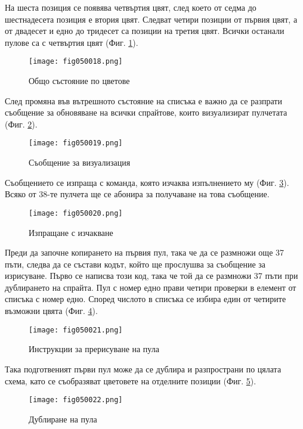 На шеста позиция се появява четвъртия цвят, след което от седма до шестнадесета позиция е втория цвят. Следват четири позиции от първия цвят, а от двадесет и едно до тридесет са позиции на третия цвят. Всички останали пулове са с четвъртия цвят (Фиг. \ref{fig050018}).

\begin{figure}[H]
  \centering
  \texttt{[image: fig050018.png]}
  \caption{Общо състояние по цветове}
\label{fig050018}
\end{figure}

След промяна във вътрешното състояние на списъка е важно да се разпрати съобщение за обновяване на всички спрайтове, които визуализират пулчетата (Фиг. \ref{fig050019}). 

\begin{figure}[H]
  \centering
  \texttt{[image: fig050019.png]}
  \caption{Съобщение за визуализация}
\label{fig050019}
\end{figure}

Съобщението се изпраща с команда, която изчаква изпълнението му (Фиг. \ref{fig050020}). Всяко от 38-те пулчета ще се абонира за получаване на това съобщение. 

\begin{figure}[H]
  \centering
  \texttt{[image: fig050020.png]}
  \caption{Изпращане с изчакване}
\label{fig050020}
\end{figure}

Преди да започне копирането на първия пул, така че да се размножи още 37 пъти, следва да се състави кодът, който ще прослушва за съобщение за изрисуване. Първо се написва този код, така че той да се размножи 37 пъти при дублирането на спрайта. Пул с номер едно прави четири проверки в елемент от списъка с номер едно. Според числото в списъка се избира един от четирите възможни цвята (Фиг. \ref{fig050021}).

\begin{figure}[H]
  \centering
  \texttt{[image: fig050021.png]}
  \caption{Инструкции за прерисуване на пула}
\label{fig050021}
\end{figure}

Така подготвеният първи пул може да се дублира и разпространи по цялата схема, като се съобразяват цветовете на отделните позиции (Фиг. \ref{fig050022}). 

\begin{figure}[H]
  \centering
  \texttt{[image: fig050022.png]}
  \caption{Дублиране на пула}
\label{fig050022}
\end{figure}

